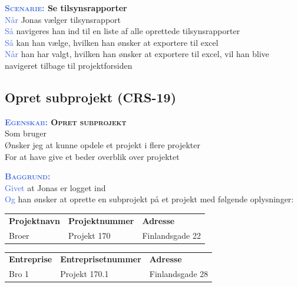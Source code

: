 \textbf{\textsc{\textcolor{RoyalBlue}{Scenarie:}} Se tilsynsrapporter}\\
\textcolor{RoyalBlue}{Når} Jonas vælger tilsynsrapport\\
\textcolor{RoyalBlue}{Så} navigeres han ind til en liste af alle oprettede tilsynsrapporter\\
\textcolor{RoyalBlue}{Så} kan han vælge, hvilken han ønsker at exportere til excel\\
\textcolor{RoyalBlue}{Når} han har valgt, hvilken han ønsker at exportere til excel, vil han blive navigeret tilbage til projektforsiden\\

\subsection{Opret subprojekt (CRS-19)} \label{sec:USOpretSubEntreprise}
\textbf{\textsc{\textcolor{RoyalBlue}{Egenskab:} Opret subprojekt}}\\
Som bruger \\
Ønsker jeg at kunne opdele et projekt i flere projekter \\
For at have give et beder overblik over projektet

\textsc{\textcolor{RoyalBlue}{\textbf{Baggrund:}}}\\
\textcolor{RoyalBlue}{Givet} at Jonas er logget ind\\
\textcolor{RoyalBlue}{Og} han ønsker at oprette en subprojekt på et projekt med følgende oplysninger:\\
\begin{tabular}{| l | l | l |}
	\textbf{Projektnavn} & \textbf{Projektnummer} & \textbf{Adresse} \\
	Broer & Projekt 170 & Finlandsgade 22 \\
\end{tabular}
\newline \newline

\begin{tabular}{| l | l | l |}
	\textbf{Entreprise} & \textbf{Entreprisetnummer} & \textbf{Adresse} \\
	Bro 1 & Projekt 170.1 & Finlandsgade 28 \\
\end{tabular}
\newline \newline

